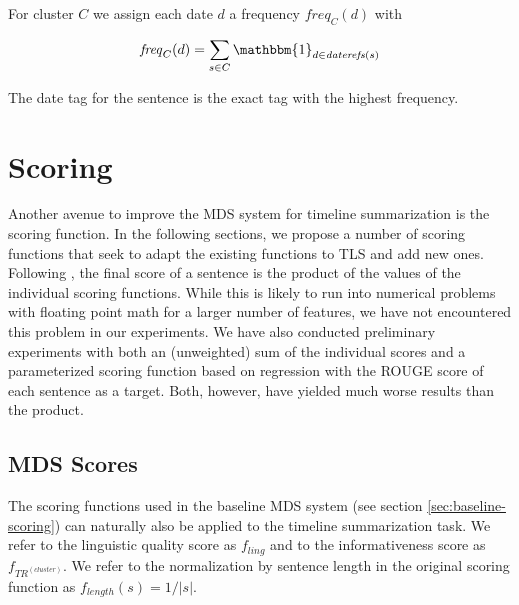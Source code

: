 \documentclass[a4paper,BCOR=10mm]{report}
\numberwithin{lemma}{chapter}
\numberwithin{definition}{chapter}
\begin{document}
For cluster $C$ we assign each date $d$ a frequency $\mathit{freq}_C(d)$ with

\begin{equation}
\mathit{freq}_C(d) = \sum_{s \in C} \mathbbm{1}_{d \in \mathit{daterefs}(s)}
\end{equation}

The date tag for the sentence is the exact tag with the highest frequency.



\section{Scoring} \label{sec:scoring}

Another avenue to improve the MDS system for timeline summarization is the scoring function.
In the following sections, we propose a number of scoring functions that seek to adapt the existing functions to TLS and add new ones.
Following \citet{banerjee}, the final score of a sentence is the product of the values of the individual scoring functions.
While this is likely to run into numerical problems with floating point math for a larger number of features, we have not encountered this problem in our experiments.
We have also conducted preliminary experiments with both an (unweighted) sum of the individual scores and a parameterized scoring function based on regression with the ROUGE score of each sentence as a target. Both, however, have yielded much worse results than the product.

\subsection{MDS Scores} \label{sec:mds-scores}

The scoring functions used in the baseline MDS system (see section \ref{sec:baseline-scoring}) can naturally also be applied to the timeline summarization task.
We refer to the linguistic quality score as $f_{ling}$ and to the informativeness score as $f_{TR^{(cluster)}}$.
We refer to the normalization by sentence length in the original scoring function as $f_{length}(s) = 1 / |s|$.
\end{document}
